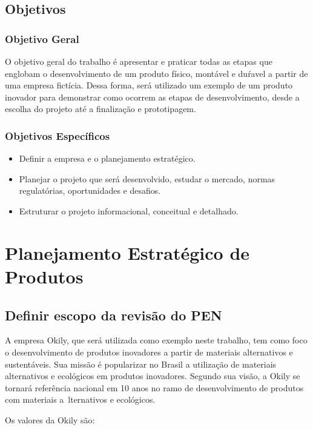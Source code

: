 \documentclass[
	12pt,				%
	openright,			%
	oneside,			%
	a4paper,			%
	english,			%
	french,				%
	spanish,			%
	brazil				%
	]{abntex2}
\begin{document}
\section{Objetivos}

\subsection{Objetivo Geral}

O objetivo geral do trabalho é apresentar e praticar todas as etapas que englobam o desenvolvimento de um produto físico, montável e duŕavel a partir de uma empresa fictícia. Dessa forma, será utilizado um exemplo de um produto inovador para demonstrar como ocorrem as etapas de desenvolvimento, desde a escolha do projeto até a finalização e prototipagem.

\subsection{Objetivos Específicos}

\begin{itemize}
\item Definir a empresa e o planejamento estratégico.
\item Planejar o projeto que será desenvolvido, estudar o mercado, normas regulatórias, oportunidades e desafios.
\item Estruturar o projeto informacional, conceitual e detalhado.
\end{itemize}

\newpage
\chapter{Planejamento Estratégico de Produtos}

\section{Definir escopo da revisão do PEN}

A empresa Okily, que será utilizada como exemplo neste trabalho, tem como foco
o desenvolvimento de produtos inovadores a partir de materiais alternativos e sustentáveis. Sua missão é popularizar no Brasil a utilização de materiais alternativos e ecológicos em produtos inovadores. Segundo sua visão, a Okily se tornará referência nacional em 10 anos no ramo de desenvolvimento de produtos com materiais a~lternativos e ecológicos.

Os valores da Okily são:
\end{document}
